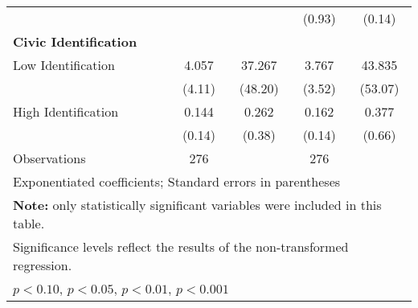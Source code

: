 \begin{table}[htbp]
\begin{tabular}{l*{4}{c}}
                              &                   &                   &    (0.93)         &    (0.14)         \\
\textbf{Civic Identification} &                   &                   &                   &                   \\
\hspace{0.25cm} Low Identification&     4.057         &    37.267\sym{**} &     3.767         &    43.835\sym{**} \\
                              &    (4.11)         &   (48.20)         &    (3.52)         &   (53.07)         \\
\hspace{0.25cm} High Identification&     0.144\sym{^+} &     0.262         &     0.162\sym{*}  &     0.377         \\
                              &    (0.14)         &    (0.38)         &    (0.14)         &    (0.66)         \\
\midrule
Observations                  &       276         &                   &       276         &                   \\
\bottomrule
\multicolumn{5}{l}{\footnotesize Exponentiated coefficients; Standard errors in parentheses}\\
\multicolumn{5}{l}{\footnotesize \textbf{Note:} only statistically significant variables were included in this table.}\\
\multicolumn{5}{l}{\footnotesize Significance levels reflect the results of the non-transformed regression.}\\
\multicolumn{5}{l}{\footnotesize \sym{^+} \(p<0.10\), \sym{*} \(p<0.05\), \sym{**} \(p<0.01\), \sym{***} \(p<0.001\)}\\
\end{tabular}
\end{table}
